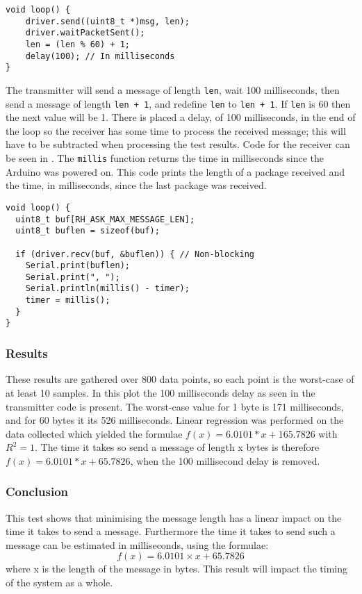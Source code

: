 \begin{lstlisting}[style=customc,float,floatplacement=!h,caption={The core of the transmitter code.},label={lst:transtestcore}]
void loop() {
    driver.send((uint8_t *)msg, len);
    driver.waitPacketSent();
    len = (len % 60) + 1;
    delay(100); // In milliseconds 
}
\end{lstlisting}

The transmitter will send a message of length \texttt{len}, wait 100 milliseconds, then send a message of length \texttt{len + 1}, and redefine \texttt{len} to \texttt{len + 1}.
If \texttt{len} is 60 then the next value will be 1. 
There is placed a delay, of 100 milliseconds, in the end of the loop so the receiver has some time to process the received message; this will have to be subtracted when processing the test results.
Code for the receiver can be seen in .
The \texttt{millis} function returns the time in milliseconds since the Arduino was powered on. 
This code prints the length of a package received and the time, in milliseconds, since the last package was received.

\begin{lstlisting}[style=customc,float,floatplacement=!h,caption={The core of the receiver code.},label={lst:recvtestcore}]
void loop() {
  uint8_t buf[RH_ASK_MAX_MESSAGE_LEN];
  uint8_t buflen = sizeof(buf);

  if (driver.recv(buf, &buflen)) { // Non-blocking
    Serial.print(buflen);
    Serial.print(", ");
    Serial.println(millis() - timer);
    timer = millis();
  }
}
\end{lstlisting}


\subsubsection*{Results}
These results are gathered over 800 data points, so each point is the worst-case of at least 10 samples. 
In this plot the 100 milliseconds delay as seen in the transmitter code is present.
The worst-case value for 1 byte is 171 milliseconds, and for 60 bytes it its 526 milliseconds. 
Linear regression was performed on the data collected which yielded the formulae $f(x)=6.0101 * x + 165.7826$ with $R^2 = 1$. 
The time it takes so send a message of length x bytes is therefore $f(x)=6.0101 * x + 65.7826$, when the 100 millisecond delay is removed.

\subsubsection*{Conclusion}
This test shows that minimising the message length has a linear impact on the time it takes to send a message. 
Furthermore the time it takes to send such a message can be estimated in milliseconds, using the formulae: 
\begin{equation}
f(x)=6.0101 \times x + 65.7826 
\label{eq:timeToSendFormular}   
\end{equation}
where x is the length of the message in bytes. 
This result will impact the timing of the system as a whole.  
